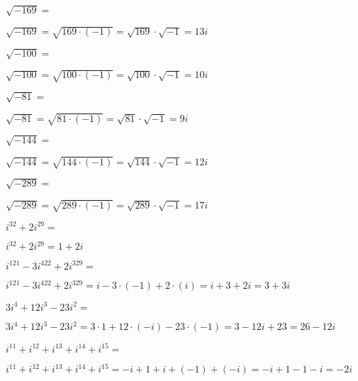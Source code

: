 \documentclass[12pt,addpoints,x11names]{exam}
\begin{document}
\begin{questions}
 \question[2] $\sqrt{-169}=$
   \begin{solutionbox}{.5in}
    $\sqrt{-169}=\sqrt{169\cdot(-1)}=\sqrt{169}\cdot\sqrt{-1}=13i$
  \end{solutionbox}
\question[2] $\sqrt{-100}=$
   \begin{solutionbox}{.5in}
    $\sqrt{-100}=\sqrt{100\cdot(-1)}=\sqrt{100}\cdot\sqrt{-1}=10i$
  \end{solutionbox}
\question[2] $\sqrt{-81}=$
   \begin{solutionbox}{1in}
    $\sqrt{-81}=\sqrt{81\cdot(-1)}=\sqrt{81}\cdot\sqrt{-1}=9i$
  \end{solutionbox}
\question[2] $\sqrt{-144}=$
   \begin{solutionbox}{1in}
    $\sqrt{-144}=\sqrt{144\cdot(-1)}=\sqrt{144}\cdot\sqrt{-1}=12i$
  \end{solutionbox}
\question[2] $\sqrt{-289}=$
  \begin{solutionbox}{1in}
    $\sqrt{-289}=\sqrt{289\cdot(-1)}=\sqrt{289}\cdot\sqrt{-1}=17i$
  \end{solutionbox}

  \pagebreak
\question[3] $i^{32}+2i^{29}=$
  \begin{solutionbox}{1.5in}
    $i^{32}+2i^{29}=1+2i$
  \end{solutionbox}
 \question[3] $i^{121}-3i^{422}+2i^{329}=$
   \begin{solutionbox}{1.5in}
    $i^{121}-3i^{422}+2i^{329}=i-3\cdot(-1)+2\cdot(i)=i+3+2i=3+3i$
  \end{solutionbox}
\question[3] $3i^{4}+12i^{3}-23i^{2}=$
   \begin{solutionbox}{1.5in}
     $3i^{4}+12i^{3}-23i^{2}=3\cdot1+12\cdot(-i)-23\cdot(-1)=3-12i+23=26-12i$
  \end{solutionbox}
\question[3] $i^{11}+i^{12}+i^{13}+i^{14}+i^{15}=$
  \begin{solutionbox}{1.5in}
     $i^{11}+i^{12}+i^{13}+i^{14}+i^{15}=-i+1+i+(-1)+(-i)=-i+1-1-i=-2i$
  \end{solutionbox}












\end{questions}
\end{document}
